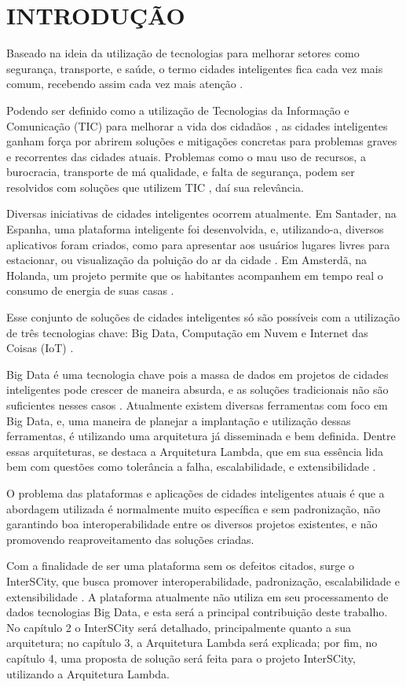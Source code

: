 \chapter[INTRODUÇÃO]{INTRODUÇÃO}


Baseado na ideia da utilização de tecnologias para melhorar setores como
segurança, transporte, e saúde, o termo cidades inteligentes fica cada vez
mais comum, recebendo assim cada vez mais atenção \cite{batty2012smart}.

Podendo ser definido como a utilização de Tecnologias da Informação e
Comunicação (TIC) para melhorar a vida dos cidadãos \cite{batty2012smart},
as cidades inteligentes ganham força por abrirem soluções e mitigações
concretas para problemas graves e recorrentes das cidades atuais. Problemas
como o mau uso de recursos, a burocracia, transporte de má qualidade,
e falta de segurança, podem ser resolvidos com soluções que utilizem TIC
\cite{batty2012smart}, daí sua relevância.

Diversas iniciativas de cidades inteligentes ocorrem atualmente. Em Santader,
na Espanha, uma plataforma inteligente foi desenvolvida, e, utilizando-a,
diversos aplicativos foram criados, como para apresentar aos usuários lugares
livres para estacionar, ou visualização da poluição do ar da
cidade \cite{santana2016software}. Em Amsterdã, na Holanda, um projeto permite
que os habitantes acompanhem em tempo real o consumo de energia de suas
casas \cite{kon2016}.

Esse conjunto de soluções de cidades inteligentes só são possíveis com a
utilização de três tecnologias chave: Big Data, Computação em Nuvem e Internet
das Coisas (IoT) \cite{delesposte2017}.

Big Data é uma tecnologia chave pois a massa de dados em projetos de cidades
inteligentes pode crescer de maneira absurda, e as soluções tradicionais não
são suficientes nesses casos \cite{batty2012smart}. Atualmente existem diversas
ferramentas com foco em Big Data, e, uma maneira de planejar a implantação
e utilização dessas ferramentas, é utilizando uma arquitetura já disseminada e
bem definida. Dentre essas arquiteturas, se destaca a Arquitetura Lambda, que
em sua essência lida bem com questões como tolerância a falha, escalabilidade,
e extensibilidade \cite{marz2015}.

O problema das plataformas e aplicações de cidades inteligentes atuais é que
a abordagem utilizada é normalmente muito específica e sem padronização,
não garantindo boa interoperabilidade entre os diversos projetos existentes, e
não promovendo reaproveitamento das soluções \cite{delesposte2017} criadas.

Com a finalidade de ser uma plataforma sem os defeitos citados, surge o
InterSCity, que busca promover interoperabilidade, padronização, escalabilidade
e extensibilidade \cite{delesposte2017}. A plataforma atualmente não utiliza
em seu processamento de dados tecnologias Big Data, e esta será a principal
contribuição deste trabalho. No capítulo 2 o InterSCity será detalhado,
principalmente quanto a sua arquitetura; no capítulo 3, a Arquitetura Lambda
será explicada; por fim, no capítulo 4, uma proposta de solução será feita
para o projeto InterSCity, utilizando a Arquitetura Lambda.
